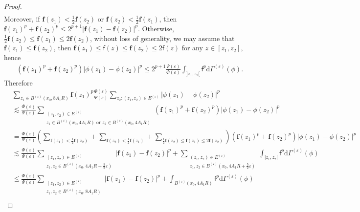 \documentclass[11pt,a4paper]{article}
\numberwithin{equation}{section}
\theoremstyle{plain}
\theoremstyle{definition}
\begin{document}
\begin{proof}
\begin{align}
\end{align}
Moreover, if $\mathbf{f}(z_1)<\frac{1}{2}\mathbf{f}(z_2)$ or $\mathbf{f}(z_2)<\frac{1}{2}\mathbf{f}(z_1)$, then $\mathbf{f}(z_1)^p+\mathbf{f}(z_2)^p\le2^{p+1}\lvert\mathbf{f}(z_1)-\mathbf{f}(z_2)\rvert^p$. Otherwise, $\frac{1}{2}\mathbf{f}(z_2)\le\mathbf{f}(z_1)\le2\mathbf{f}(z_2)$, without loss of generality, we may assume that $\mathbf{f}(z_1)\le\mathbf{f}(z_2)$, then $\mathbf{f}(z_1)\le\mathsf{f}(z)\le\mathbf{f}(z_2)\le2\mathsf{f}(z)$ for any $z\in[z_1,z_2]$, hence
\begin{align*}
&\left(\mathbf{f}(z_1)^p+\mathbf{f}(z_2)^p\right)|\phi(z_1)-\phi(z_2)|^p\le2^{p+1}\frac{\Psi(\varepsilon)}{\Phi(\varepsilon)}\int_{]z_1,z_2[}\mathsf{f}^p\mathrm{d}\Gamma^{(\varepsilon)}(\phi).
\end{align*}
Therefore
\begin{align*}
&\sum_{z_1\in B^{(\varepsilon)}(x_0,8A_1R)}\mathbf{f}(z_1)^p \frac{\Phi(\varepsilon)}{\Psi(\varepsilon)}\sum_{z_2:(z_1,z_2)\in E^{(\varepsilon)}}|\phi(z_1)-\phi(z_2)|^p\\
&\lesssim\frac{\Phi(\varepsilon)}{\Psi(\varepsilon)}\sum_{\substack{(z_1,z_2)\in E^{(\varepsilon)}\\z_1\in B^{(\varepsilon)}(x_0,4A_1R)\text{ or }z_2\in B^{(\varepsilon)}(x_0,4A_1R)}}\left(\mathbf{f}(z_1)^p+\mathbf{f}(z_2)^p\right)|\phi(z_1)-\phi(z_2)|^p\\
&=\frac{\Phi(\varepsilon)}{\Psi(\varepsilon)}\left(\sum_{\mathbf{f}(z_1)<\frac{1}{2}\mathbf{f}(z_2)}+\sum_{\mathbf{f}(z_2)<\frac{1}{2}\mathbf{f}(z_1)}+\sum_{\frac{1}{2}\mathbf{f}(z_2)\le\mathbf{f}(z_1)\le2\mathbf{f}(z_2)}\right)\left(\mathbf{f}(z_1)^p+\mathbf{f}(z_2)^p\right)|\phi(z_1)-\phi(z_2)|^p\\
&\lesssim\frac{\Phi(\varepsilon)}{\Psi(\varepsilon)}\sum_{\substack{(z_1,z_2)\in E^{(\varepsilon)}\\z_1,z_2\in B^{(\varepsilon)}(x_0,4A_1R+\frac{5}{2}\varepsilon)}}|\mathbf{f}(z_1)-\mathbf{f}(z_2)|^p+\sum_{\substack{(z_1,z_2)\in E^{(\varepsilon)}\\z_1,z_2\in B^{(\varepsilon)}(x_0,4A_1R+\frac{5}{2}\varepsilon)}}\int_{]z_1,z_2[}\mathsf{f}^p\mathrm{d}\Gamma^{(\varepsilon)}(\phi)\\
&\le\frac{\Phi(\varepsilon)}{\Psi(\varepsilon)}\sum_{\substack{(z_1,z_2)\in E^{(\varepsilon)}\\z_1,z_2\in B^{(\varepsilon)}(x_0,8A_1R)}}|\mathbf{f}(z_1)-\mathbf{f}(z_2)|^p+\int_{B^{(\varepsilon)}(x_0,4A_1R)}\mathsf{f}^p\mathrm{d}\Gamma^{(\varepsilon)}(\phi)\\

\end{align*}
\end{proof}
\end{document}
